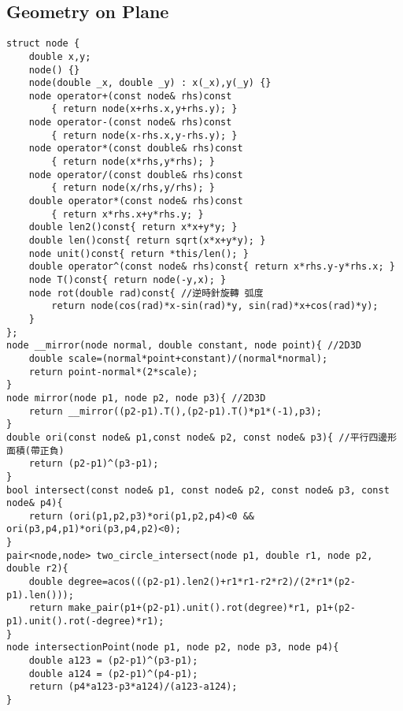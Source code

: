 \documentclass[11pt,twocolumn,a4paper]{article}
\begin{document}
\subsection{Geometry on Plane}
\begin{lstlisting}[label=Geometry on Plane]
struct node {
	double x,y;
	node() {}
	node(double _x, double _y) : x(_x),y(_y) {}
	node operator+(const node& rhs)const
		{ return node(x+rhs.x,y+rhs.y); }
	node operator-(const node& rhs)const
		{ return node(x-rhs.x,y-rhs.y); }
	node operator*(const double& rhs)const
		{ return node(x*rhs,y*rhs); }
	node operator/(const double& rhs)const
		{ return node(x/rhs,y/rhs); }
	double operator*(const node& rhs)const
		{ return x*rhs.x+y*rhs.y; }
	double len2()const{ return x*x+y*y; }
	double len()const{ return sqrt(x*x+y*y); }
	node unit()const{ return *this/len(); }
	double operator^(const node& rhs)const{ return x*rhs.y-y*rhs.x; }
	node T()const{ return node(-y,x); }
	node rot(double rad)const{ //逆時針旋轉 弧度
		return node(cos(rad)*x-sin(rad)*y, sin(rad)*x+cos(rad)*y);
	}
};
node __mirror(node normal, double constant, node point){ //2D3D
	double scale=(normal*point+constant)/(normal*normal);
	return point-normal*(2*scale);
}
node mirror(node p1, node p2, node p3){ //2D3D
	return __mirror((p2-p1).T(),(p2-p1).T()*p1*(-1),p3);
}
double ori(const node& p1,const node& p2, const node& p3){ //平行四邊形面積(帶正負)
	return (p2-p1)^(p3-p1);
}
bool intersect(const node& p1, const node& p2, const node& p3, const node& p4){
	return (ori(p1,p2,p3)*ori(p1,p2,p4)<0 && ori(p3,p4,p1)*ori(p3,p4,p2)<0);
}
pair<node,node> two_circle_intersect(node p1, double r1, node p2, double r2){
	double degree=acos(((p2-p1).len2()+r1*r1-r2*r2)/(2*r1*(p2-p1).len()));
	return make_pair(p1+(p2-p1).unit().rot(degree)*r1, p1+(p2-p1).unit().rot(-degree)*r1);
}
node intersectionPoint(node p1, node p2, node p3, node p4){
	double a123 = (p2-p1)^(p3-p1);
	double a124 = (p2-p1)^(p4-p1);
	return (p4*a123-p3*a124)/(a123-a124);
}
\end{lstlisting}
\end{document}
